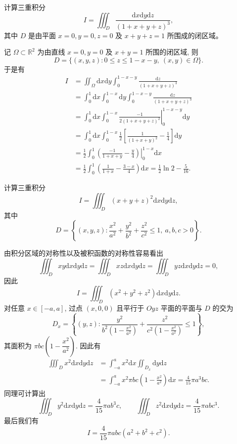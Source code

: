 \documentclass[UTF8,12pt,a4paper,fontset=fandol]{ctexart}
\begin{document}
\begin{example}\label{course-example-15-3-5}\quad 计算三重积分
\[
  I=\iiint_D\frac{\mathrm dx\mathrm dy\mathrm dz}{(1+x+y+z)^3},
\]
其中 $D$ 是由平面 $x=0,y=0,z=0$ 及 $x+y+z=1$ 所围成的闭区域。

\end{example}
\begin{solve}\quad 记 $\Omega\subset\mathbb R^2$ 为由直线 $x=0,y=0$ 及 $x+y=1$ 所围的闭区域, 则
\[
  D=\{(x,y,z):0\leqslant z\leqslant1-x-y,\ (x,y)\in\Omega\}.
\]
于是有
\[
\begin{aligned}
  I
  &=\iint_\Omega\mathrm dx\mathrm dy\int_0^{1-x-y}\frac{\mathrm dz}{(1+x+y+z)^3}\\
  &=\int_0^1\mathrm dx\int_0^{1-x}\mathrm dy\int_0^{1-x-y}\frac{\mathrm dz}{(1+x+y+z)^3}\\
  &=\int_0^1\mathrm dx\int_0^{1-x}
    \left.\frac{-1}{2(1+x+y+z)^2}\right|_0^{1-x-y}\mathrm dy\\
  &=\int_0^1\mathrm dx\int_0^{1-x}\frac12\left[\frac1{(1+x+y)^2}-\frac14\right]\mathrm dy\\
  &=\frac12\int_0^1\left.\left(\frac{-1}{1+x+y}-\frac y4\right)\right|_0^{1-x}\mathrm dx\\
  &=\frac12\int_0^1\left(\frac1{1+x}-\frac{3-x}{4}\right)\mathrm dx
    =\frac12\ln2-\frac5{16}.
\end{aligned}
\]

\end{solve}
\begin{example}\label{course-example-15-3-6}\quad 计算三重积分
\[
  I=\iiint_D (x+y+z)^2\mathrm dx\mathrm dy\mathrm dz,
\]
其中
\[
  D=\left\{(x,y,z):\frac{x^2}{a^2}+\frac{y^2}{b^2}+\frac{z^2}{c^2}\leqslant1,\ a,b,c>0\right\}.
\]

\end{example}
\begin{solve}\quad 由积分区域的对称性以及被积函数的对称性容易看出
\[
  \iiint_D xy\mathrm dx\mathrm dy\mathrm dz
  =\iiint_D xz\mathrm dx\mathrm dy\mathrm dz
  =\iiint_D yz\mathrm dx\mathrm dy\mathrm dz=0,
\]
因此
\[
  I=\iiint_D (x^2+y^2+z^2)\mathrm dx\mathrm dy\mathrm dz.
\]
对任意 $x\in[-a,a]$, 过点 $(x,0,0)$ 且平行于 $Oyz$ 平面的平面与 $D$ 的交为
\[
  D_x=\left\{(y,z):\frac{y^2}{b^2\left(1-\frac{x^2}{a^2}\right)}
  +\frac{z^2}{c^2\left(1-\frac{x^2}{a^2}\right)}\leqslant1\right\},
\]
其面积为 $\pi bc\left(1-\dfrac{x^2}{a^2}\right)$. 因此有
\[
\begin{aligned}
  \iiint_D x^2\mathrm dx\mathrm dy\mathrm dz
  &=\int_{-a}^a x^2\mathrm dx\iint_{D_x}\mathrm dy\mathrm dz\\
  &=\int_{-a}^a x^2\pi bc\left(1-\frac{x^2}{a^2}\right)\mathrm dx
    =\frac4{15}\pi a^3bc.
\end{aligned}
\]
同理可计算出
\[
  \iiint_D y^2\mathrm dx\mathrm dy\mathrm dz=\frac4{15}\pi ab^3c,\qquad
  \iiint_D z^2\mathrm dx\mathrm dy\mathrm dz=\frac4{15}\pi abc^3.
\]
最后我们有
\[
  I=\frac4{15}\pi abc(a^2+b^2+c^2).
\]

\end{solve}
\end{document}
